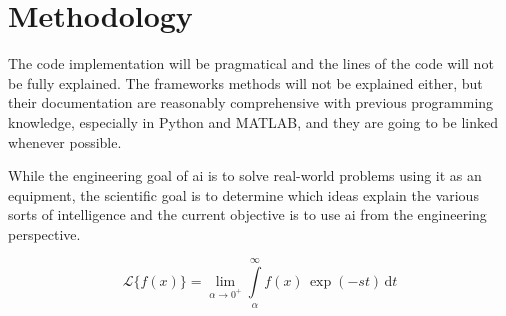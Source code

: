 \chapter{Methodology}\label{sec:methodology}

The code implementation will be pragmatical and the lines of the code will not be fully explained. The frameworks methods will not be explained either, but their documentation are reasonably comprehensive with previous programming knowledge, especially in Python and MATLAB, and they are going to be linked whenever possible.

While the engineering goal of \gls*{ai} is to solve real-world problems using it as an equipment, the scientific goal is to determine which ideas explain the various sorts of intelligence \cite{winston1992} and the current objective is to use \gls*{ai} from the engineering perspective.

\begin{equation}
    \mathcal{L}\{f(x)\} = \lim_{\alpha\to 0^+}\int\limits_{\alpha}^{\infty} f(x)\,\exp(-st)\, \mathrm{d}t
\end{equation}